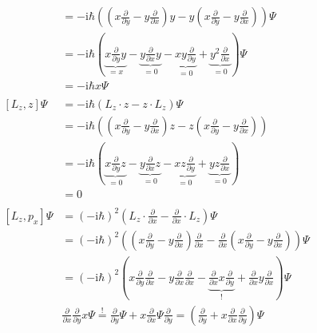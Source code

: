 \begin{align*}
        &= -\text{i}\hbar \left( \left( x\frac{\partial}{\partial y} - y\frac{\partial}{\partial x} \right)y - y\left( x\frac{\partial}{\partial y} - y\frac{\partial}{\partial x} \right) \right)\Psi\\
        &= -\text{i}\hbar \left( \underbrace{x\frac{\partial}{\partial y}y}_{=x} - \underbrace{y\frac{\partial}{\partial x}y}_{=0} - \underbrace{xy\frac{\partial}{\partial y}}_{=0} + \underbrace{y^2\frac{\partial}{\partial x}}_{=0} \right)\Psi\\
        &= -\text{i}\hbar x\Psi\\
        \\
        \left[ L_z,z \right]\Psi &= -\text{i}\hbar \left( L_z\cdot z - z \cdot L_z \right) \Psi\\
        &= -\text{i}\hbar \left( \left( x\frac{\partial}{\partial y} - y\frac{\partial}{\partial x} \right)z - z\left( x\frac{\partial}{\partial y} - y\frac{\partial}{\partial x} \right) \right)\\
        &= -\text{i}\hbar \left( \underbrace{x\frac{\partial}{\partial y}z}_{=0} - \underbrace{y\frac{\partial}{\partial x}z}_{=0} - \underbrace{xz\frac{\partial}{\partial y}}_{=0} + \underbrace{yz\frac{\partial}{\partial x}}_{=0} \right)\\
        &= 0\\
        \\
        \left[ L_z,p_x \right]\Psi &= \left( -\text{i}\hbar \right)^2 \left(L_z\cdot \frac{\partial}{\partial x} - \frac{\partial}{\partial x} \cdot L_z\right)\Psi\\
        &= \left( -\text{i}\hbar \right)^2 \left( \left( x\frac{\partial}{\partial y} - y\frac{\partial}{\partial x} \right) \frac{\partial}{\partial x} -\frac{\partial}{\partial x} \left( x\frac{\partial}{\partial y} - y\frac{\partial}{\partial x} \right) \right)\Psi\\
        &= \left( -\text{i}\hbar \right)^2 \left( x\frac{\partial}{\partial y}\frac{\partial}{\partial x} - y\frac{\partial}{\partial x}\frac{\partial}{\partial x} - \underbrace{\frac{\partial}{\partial x}x \frac{\partial}{\partial y}}_{!} + \frac{\partial}{\partial x}y \frac{\partial}{\partial x} \right)\Psi\\
        &\frac{\partial}{\partial x} \frac{\partial}{\partial y} x\Psi \stackrel{!}{=} \frac{\partial}{\partial y}\Psi + x\frac{\partial}{\partial x}\Psi \frac{\partial}{\partial y} = \left( \frac{\partial}{\partial y} + x\frac{\partial}{\partial x} \frac{\partial}{\partial y} \right) \Psi\\

\end{align*}
